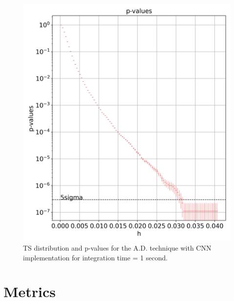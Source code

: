\begin{figure}[!htb]
\begin{minipage}{0.5\textwidth}
       \includegraphics[width=\linewidth]{figures/experiments/p_val/model_6/pvalue_bins_100.png}
    \end{minipage}
    \caption{TS distribution and p-values for the A.D. technique with CNN implementation for integration time = 1 second.}
    \label{fig:ts-distribution-and-p-values-rnn-it-1}
\end{figure}





\section{Metrics}
\label{s:appendix-metrics}


